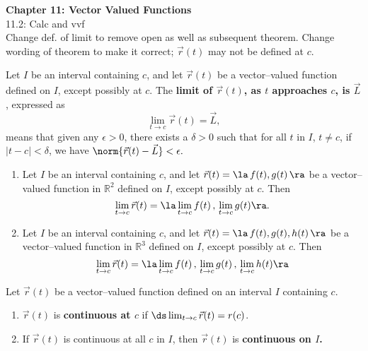 \documentclass{article}
\begin{document}
\noindent\large\textbf{Chapter 11: Vector Valued Functions}\normalsize\\

11.2: Calc and vvf\\

Change def. of limit to remove open as well as subsequent theorem. Change wording of theorem to make it correct; $\vec r(t)$ may not be defined at $c$.

{Let $I$ be an interval containing $c$, and let $\vec r(t)$ be a vector--valued function defined on $I$, except possibly at $c$. %
The \textbf{limit of $\vec r(t)$, as $t$ approaches $c$, is $\vec L$}, expressed as 
$$\lim_{t\to c} \vec r(t) = \vec L,$$ means that given any $\epsilon>0$, there exists a $\delta>0$ such that for all $t$ in $I$, $t\neq c$, if $|t-c| <\delta$, we have $\norm{\vec r(t) - \vec L} < \epsilon.$
}

{\begin{enumerate}
	\item Let $I$ be an interval containing $c$, and let $\vec r(t)= \la \,f(t),g(t)\,\ra$ be a vector--valued function in $\mathbb{R}^2$ defined on $I$, except possibly at $c$. Then
	$$\lim_{t\to c} \vec r(t) = \la \lim_{t\to c}f(t)\, , \,\lim_{t\to c} g(t)\ra.$$
	\item Let $I$ be an interval containing $c$, and let $\vec r(t)= \la \,f(t),g(t),h(t)\,\ra$ be a vector--valued function in $\mathbb{R}^3$ defined on $I$, except possibly at $c$. Then 
	$$\lim_{t\to c} \vec r(t) = \la \lim_{t\to c}f(t)\, , \,\lim_{t\to c} g(t)\,, \,\lim_{t\to c} h(t)\ra$$
\end{enumerate}
}

{Let $\vec r(t)$ be a vector--valued function defined on an  interval $I$ containing $c$.
\begin{enumerate}
	\item $\vec r(t)$ is \textbf{continuous at $c$} if $\ds \lim_{t\to c} \vec r(t) = r(c)$.
	\item	If $\vec r(t)$ is continuous at all $c$ in $I$, then $\vec r(t)$ is \textbf{continuous on $I$.}
\end{enumerate}
}
\end{document}
